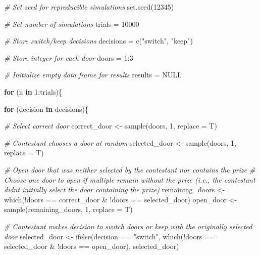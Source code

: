 \documentclass[
]{book}
\newenvironment{Shaded}{\begin{snugshade}}{\end{snugshade}}
\newcommand{\AttributeTok}[1]{\textcolor[rgb]{0.77,0.63,0.00}{#1}}
\newcommand{\CommentTok}[1]{\textcolor[rgb]{0.56,0.35,0.01}{\textit{#1}}}
\newcommand{\ConstantTok}[1]{\textcolor[rgb]{0.00,0.00,0.00}{#1}}
\newcommand{\ControlFlowTok}[1]{\textcolor[rgb]{0.13,0.29,0.53}{\textbf{#1}}}
\newcommand{\DecValTok}[1]{\textcolor[rgb]{0.00,0.00,0.81}{#1}}
\newcommand{\FunctionTok}[1]{\textcolor[rgb]{0.00,0.00,0.00}{#1}}
\newcommand{\NormalTok}[1]{#1}
\newcommand{\OtherTok}[1]{\textcolor[rgb]{0.56,0.35,0.01}{#1}}
\newcommand{\SpecialCharTok}[1]{\textcolor[rgb]{0.00,0.00,0.00}{#1}}
\newcommand{\StringTok}[1]{\textcolor[rgb]{0.31,0.60,0.02}{#1}}
\begin{document}
\begin{Shaded}
\begin{Highlighting}[]
\CommentTok{\# Set seed for reproducible simulations}
\FunctionTok{set.seed}\NormalTok{(}\DecValTok{12345}\NormalTok{)}

\CommentTok{\# Set number of simulations}
\NormalTok{trials }\OtherTok{=} \DecValTok{10000}

\CommentTok{\# Store switch/keep decisions}
\NormalTok{decisions }\OtherTok{=} \FunctionTok{c}\NormalTok{(}\StringTok{"switch"}\NormalTok{, }\StringTok{"keep"}\NormalTok{)}

\CommentTok{\# Store integer for each door}
\NormalTok{doors }\OtherTok{=} \DecValTok{1}\SpecialCharTok{:}\DecValTok{3}

\CommentTok{\# Initialize empty data frame for results}
\NormalTok{results }\OtherTok{=} \ConstantTok{NULL}

\ControlFlowTok{for}\NormalTok{ (n }\ControlFlowTok{in} \DecValTok{1}\SpecialCharTok{:}\NormalTok{trials)\{}
  
  \ControlFlowTok{for}\NormalTok{ (decision }\ControlFlowTok{in}\NormalTok{ decisions)\{}
    
    \CommentTok{\# Select correct door}
\NormalTok{    correct\_door }\OtherTok{\textless{}{-}} \FunctionTok{sample}\NormalTok{(doors, }\DecValTok{1}\NormalTok{, }\AttributeTok{replace =}\NormalTok{ T)}

    \CommentTok{\# Contestant chooses a door at random}
\NormalTok{    selected\_door }\OtherTok{\textless{}{-}} \FunctionTok{sample}\NormalTok{(doors, }\DecValTok{1}\NormalTok{, }\AttributeTok{replace =}\NormalTok{ T)}
  
    \CommentTok{\# Open door that was neither selected by the contestant nor contains the prize}
    \CommentTok{\# Choose one door to open if multiple remain without the prize (i.e., the contestant didn\textquotesingle{}t initially select the door containing the prize)}
\NormalTok{    remaining\_doors }\OtherTok{\textless{}{-}} \FunctionTok{which}\NormalTok{(}\SpecialCharTok{!}\NormalTok{doors }\SpecialCharTok{==}\NormalTok{ correct\_door }\SpecialCharTok{\&} \SpecialCharTok{!}\NormalTok{doors }\SpecialCharTok{==}\NormalTok{ selected\_door)}
\NormalTok{    open\_door }\OtherTok{\textless{}{-}} \FunctionTok{sample}\NormalTok{(remaining\_doors, }\DecValTok{1}\NormalTok{, }\AttributeTok{replace =}\NormalTok{ T) }
  
    \CommentTok{\# Contestant makes decision to switch doors or keep with the originally selected door}
\NormalTok{    selected\_door }\OtherTok{\textless{}{-}} \FunctionTok{ifelse}\NormalTok{(decision }\SpecialCharTok{==} \StringTok{"switch"}\NormalTok{, }\FunctionTok{which}\NormalTok{(}\SpecialCharTok{!}\NormalTok{doors }\SpecialCharTok{==}\NormalTok{ selected\_door }\SpecialCharTok{\&} \SpecialCharTok{!}\NormalTok{doors }\SpecialCharTok{==}\NormalTok{ open\_door), selected\_door)}
    

\end{Highlighting}
\end{Shaded}
\end{document}
